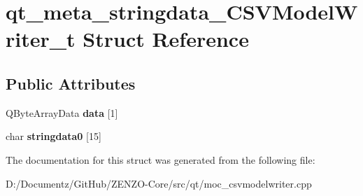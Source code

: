\hypertarget{structqt__meta__stringdata___c_s_v_model_writer__t}{}\section{qt\+\_\+meta\+\_\+stringdata\+\_\+\+C\+S\+V\+Model\+Writer\+\_\+t Struct Reference}
\label{structqt__meta__stringdata___c_s_v_model_writer__t}
\subsection*{Public Attributes}
\begin{DoxyCompactItemize}
\item 
\mbox{\label{structqt__meta__stringdata___c_s_v_model_writer__t_a36442b1d1905b2dc931c8ff1c036d78d}} 
Q\+Byte\+Array\+Data {\bfseries data} \mbox{[}1\mbox{]}
\item 
\mbox{\label{structqt__meta__stringdata___c_s_v_model_writer__t_ad46769c70f2f6aae60676e9efd696a32}} 
char {\bfseries stringdata0} \mbox{[}15\mbox{]}
\end{DoxyCompactItemize}


The documentation for this struct was generated from the following file\+:\begin{DoxyCompactItemize}
\item 
D\+:/\+Documentz/\+Git\+Hub/\+Z\+E\+N\+Z\+O-\/\+Core/src/qt/moc\+\_\+csvmodelwriter.\+cpp\end{DoxyCompactItemize}
